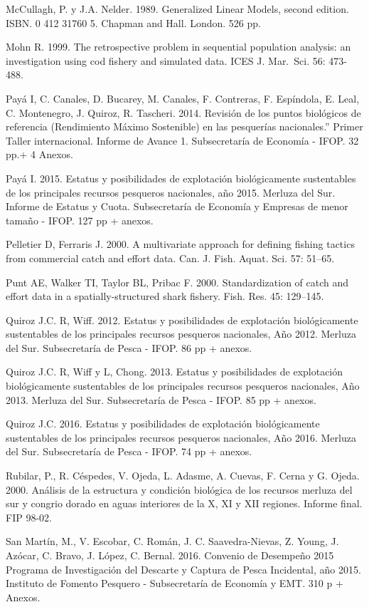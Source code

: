 \documentclass[
  spanish,
]{article}
\begin{document}
McCullagh, P. y J.A. Nelder. 1989. Generalized Linear Models, second
edition. ISBN. 0 412 31760 5. Chapman and Hall. London. 526 pp.~

Mohn R. 1999. The retrospective problem in sequential population
analysis: an investigation using cod fishery and simulated data. ICES J.
Mar.~Sci. 56: 473-488.

Payá I, C. Canales, D. Bucarey, M. Canales, F. Contreras, F. Espíndola,
E. Leal, C. Montenegro, J. Quiroz, R. Tascheri. 2014. Revisión de los
puntos biológicos de referencia (Rendimiento Máximo Sostenible) en las
pesquerías nacionales.'' Primer Taller internacional. Informe de Avance
1. Subsecretaría de Economía - IFOP. 32 pp.+ 4 Anexos.

Payá I. 2015. Estatus y posibilidades de explotación biológicamente
sustentables de los principales recursos pesqueros nacionales, año 2015.
Merluza del Sur. Informe de Estatus y Cuota. Subsecretaría de Economía y
Empresas de menor tamaño - IFOP. 127 pp + anexos.

Pelletier D, Ferraris J. 2000. A multivariate approach for defining
fishing tactics from commercial catch and effort data. Can. J. Fish.
Aquat. Sci. 57: 51--65.

Punt AE, Walker TI, Taylor BL, Pribac F. 2000. Standardization of catch
and effort data in a spatially-structured shark fishery. Fish. Res. 45:
129--145.

Quiroz J.C. R, Wiff. 2012. Estatus y posibilidades de explotación
biológicamente sustentables de los principales recursos pesqueros
nacionales, Año 2012. Merluza del Sur. Subsecretaría de Pesca - IFOP. 86
pp + anexos.

Quiroz J.C. R, Wiff y L, Chong. 2013. Estatus y posibilidades de
explotación biológicamente sustentables de los principales recursos
pesqueros nacionales, Año 2013. Merluza del Sur. Subsecretaría de Pesca
- IFOP. 85 pp + anexos.

Quiroz J.C. 2016. Estatus y posibilidades de explotación biológicamente
sustentables de los principales recursos pesqueros nacionales, Año 2016.
Merluza del Sur. Subsecretaría de Pesca - IFOP. 74 pp + anexos.

Rubilar, P., R. Céspedes, V. Ojeda, L. Adasme, A. Cuevas, F. Cerna y G.
Ojeda. 2000. Análisis de la estructura y condición biológica de los
recursos merluza del sur y congrio dorado en aguas interiores de la X,
XI y XII regiones. Informe final. FIP 98-02.

San Martín, M., V. Escobar, C. Román, J. C. Saavedra-Nievas, Z. Young,
J. Azócar, C. Bravo, J. López, C. Bernal. 2016. Convenio de Desempeño
2015 Programa de Investigación del Descarte y Captura de Pesca
Incidental, año 2015. Instituto de Fomento Pesquero - Subsecretaría de
Economía y EMT. 310 p + Anexos.
\end{document}
